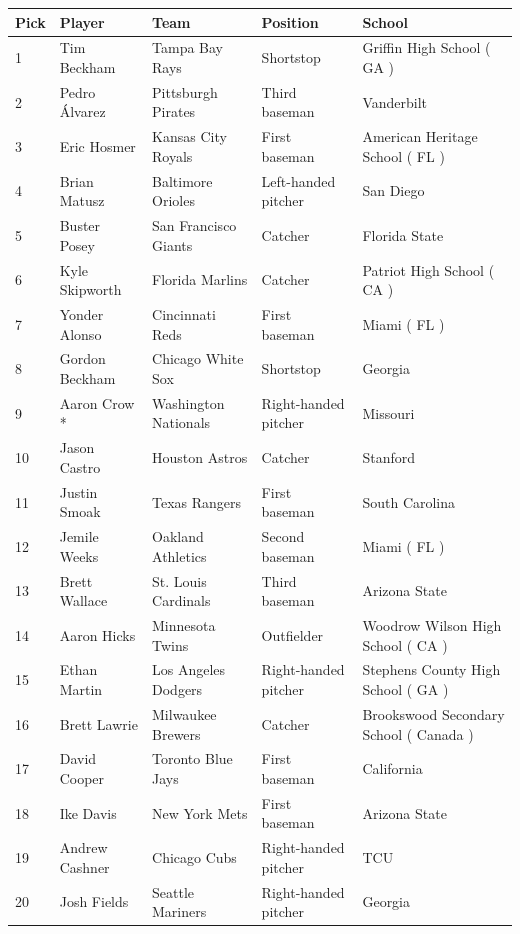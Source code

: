 \documentclass{article}
\begin{document}
\begin{tabular}{lllll}
\toprule
Pick & Player & Team & Position & School \\
\midrule
1 & Tim Beckham & Tampa Bay Rays & Shortstop & Griffin High School ( GA ) \\
2 & Pedro Álvarez & Pittsburgh Pirates & Third baseman & Vanderbilt \\
3 & Eric Hosmer & Kansas City Royals & First baseman & American Heritage School ( FL ) \\
4 & Brian Matusz & Baltimore Orioles & Left-handed pitcher & San Diego \\
5 & Buster Posey & San Francisco Giants & Catcher & Florida State \\
6 & Kyle Skipworth & Florida Marlins & Catcher & Patriot High School ( CA ) \\
7 & Yonder Alonso & Cincinnati Reds & First baseman & Miami ( FL ) \\
8 & Gordon Beckham & Chicago White Sox & Shortstop & Georgia \\
9 & Aaron Crow * & Washington Nationals & Right-handed pitcher & Missouri \\
10 & Jason Castro & Houston Astros & Catcher & Stanford \\
11 & Justin Smoak & Texas Rangers & First baseman & South Carolina \\
12 & Jemile Weeks & Oakland Athletics & Second baseman & Miami ( FL ) \\
13 & Brett Wallace & St. Louis Cardinals & Third baseman & Arizona State \\
14 & Aaron Hicks & Minnesota Twins & Outfielder & Woodrow Wilson High School ( CA ) \\
15 & Ethan Martin & Los Angeles Dodgers & Right-handed pitcher & Stephens County High School ( GA ) \\
16 & Brett Lawrie & Milwaukee Brewers & Catcher & Brookswood Secondary School ( Canada ) \\
17 & David Cooper & Toronto Blue Jays & First baseman & California \\
18 & Ike Davis & New York Mets & First baseman & Arizona State \\
19 & Andrew Cashner & Chicago Cubs & Right-handed pitcher & TCU \\
20 & Josh Fields & Seattle Mariners & Right-handed pitcher & Georgia \\
\bottomrule
\end{tabular}
\end{document}

